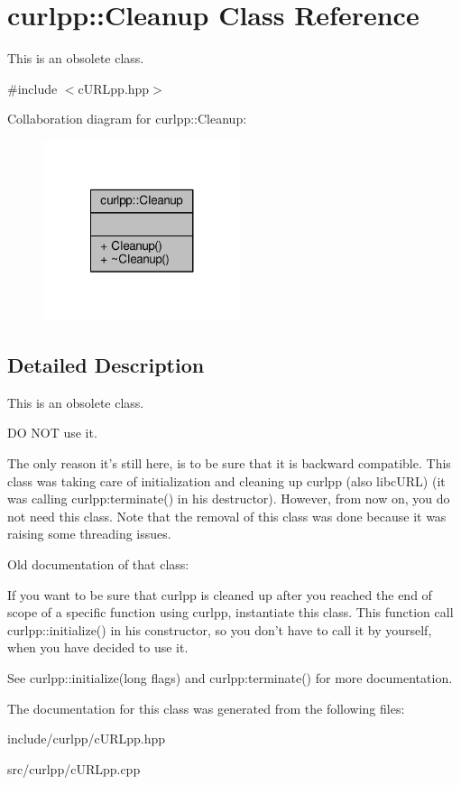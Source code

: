 \hypertarget{classcurlpp_1_1Cleanup}{\section{curlpp\-:\-:Cleanup Class Reference}
\label{classcurlpp_1_1Cleanup}
}


This is an obsolete class.  




{\ttfamily \#include $<$c\-U\-R\-Lpp.\-hpp$>$}



Collaboration diagram for curlpp\-:\-:Cleanup\-:
\nopagebreak
\begin{figure}[H]
\begin{center}
\leavevmode
\includegraphics[width=164pt]{classcurlpp_1_1Cleanup__coll__graph}
\end{center}
\end{figure}


\subsection{Detailed Description}
This is an obsolete class. 

D\-O N\-O\-T use it.

The only reason it's still here, is to be sure that it is backward compatible. This class was taking care of initialization and cleaning up curlpp (also libc\-U\-R\-L) (it was calling curlpp\-:terminate() in his destructor). However, from now on, you do not need this class. Note that the removal of this class was done because it was raising some threading issues.

Old documentation of that class\-:

If you want to be sure that curlpp is cleaned up after you reached the end of scope of a specific function using curlpp, instantiate this class. This function call curlpp\-::initialize() in his constructor, so you don't have to call it by yourself, when you have decided to use it.

See curlpp\-::initialize(long flags) and curlpp\-:terminate() for more documentation. 

The documentation for this class was generated from the following files\-:\begin{DoxyCompactItemize}
\item 
include/curlpp/c\-U\-R\-Lpp.\-hpp\item 
src/curlpp/c\-U\-R\-Lpp.\-cpp\end{DoxyCompactItemize}
